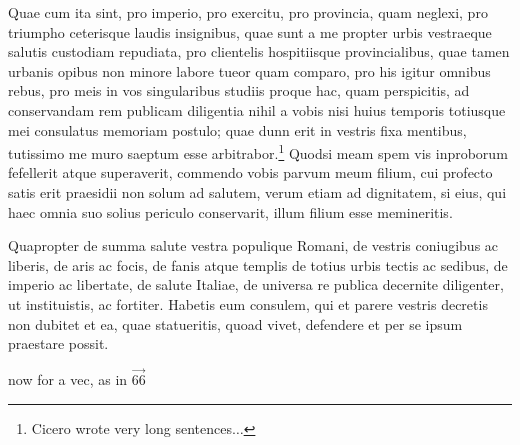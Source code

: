 \documentclass{elsart}
\begin{document}
 Quae cum ita sint, pro imperio, pro exercitu, pro provincia, quam
neglexi, pro triumpho ceterisque laudis insignibus, quae sunt a me
propter urbis vestraeque salutis custodiam repudiata, pro clientelis
hospitiisque provincialibus, quae tamen urbanis opibus non minore labore
tueor quam comparo, pro his igitur omnibus rebus, pro meis in vos
singularibus studiis proque hac, quam perspicitis, ad conservandam rem
publicam diligentia nihil a vobis nisi huius temporis totiusque mei
consulatus memoriam postulo; quae dunn erit in vestris fixa mentibus,
tutissimo me muro saeptum esse arbitrabor.\footnote{Cicero wrote very
  long sentences$\ldots$} Quodsi meam spem vis
inproborum fefellerit atque superaverit, commendo vobis parvum meum
filium, cui profecto satis erit praesidii non solum ad salutem, verum
etiam ad dignitatem, si eius, qui haec omnia suo solius periculo
conservarit, illum filium esse memineritis. \par Quapropter de summa salute
vestra populique Romani, de vestris coniugibus ac liberis, de aris ac
focis, de fanis atque templis de totius urbis tectis ac sedibus, de
imperio ac libertate, de salute Italiae, de universa re publica
decernite diligenter, ut instituistis, ac fortiter. Habetis eum
consulem, qui et parere vestris decretis non dubitet et ea, quae
statueritis, quoad vivet, defendere et per se ipsum praestare possit.

now for a vec, as in $\vec{66}$
\end{document}
